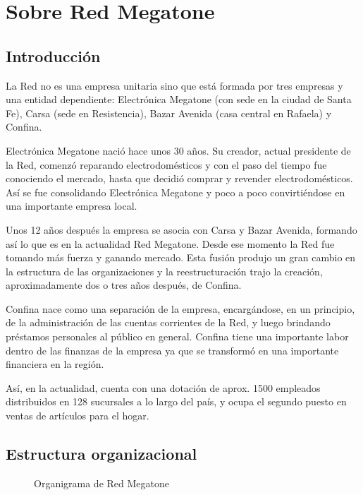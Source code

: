 \section{Sobre Red Megatone}


\subsection{Introducción}

La Red no es una empresa unitaria sino que está formada por tres empresas y una
entidad dependiente: Electrónica Megatone (con sede en la ciudad de Santa Fe),
Carsa (sede en Resistencia), Bazar Avenida (casa central en Rafaela) y Confina.

Electrónica Megatone nació hace unos 30 años. Su creador, actual presidente de
la Red, comenzó reparando electrodomésticos y con el paso del tiempo fue
conociendo el mercado, hasta que decidió comprar y revender electrodomésticos.
Así se fue consolidando Electrónica Megatone y poco a poco convirtiéndose en
una importante empresa local. 

Unos 12 años después la empresa se asocia con Carsa y Bazar Avenida, formando
así lo que es en la actualidad Red Megatone. Desde ese momento la Red fue
tomando más fuerza y ganando mercado. Esta fusión produjo un gran cambio en la
estructura de las organizaciones y la reestructuración trajo la creación,
aproximadamente dos o tres años después, de Confina.

Confina nace como una separación de la empresa, encargándose, en un principio,
de la administración de las cuentas corrientes de la Red, y luego brindando
préstamos personales al público en general. Confina tiene una importante labor
dentro de las finanzas de la empresa ya que se transformó en una importante
financiera en la región.

Así, en la actualidad, cuenta con una dotación de aprox. 1500 empleados
distribuidos en 128 sucursales a lo largo del país, y ocupa el segundo puesto
en ventas de artículos para el hogar.


\subsection{Estructura organizacional}

\begin{figure}[h]
  \caption{Organigrama de Red Megatone}
  \label{fig:organigrama}
\end{figure}

